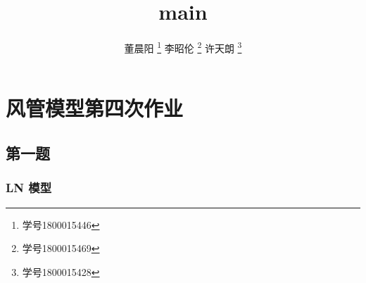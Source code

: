 \documentclass[11pt]{article}
\author{
    董晨阳 \thanks{学号1800015446}
    李昭伦 \thanks{学号1800015469}
    许天朗 \thanks{学号1800015428}
}
\title{main}
\begin{document}
    
    \maketitle
    
    

    
    \hypertarget{ux98ceux7ba1ux6a21ux578bux7b2cux56dbux6b21ux4f5cux4e1a}{%
\section{风管模型第四次作业}\label{ux98ceux7ba1ux6a21ux578bux7b2cux56dbux6b21ux4f5cux4e1a}}

\hypertarget{ux7b2cux4e00ux9898}{%
\subsection{第一题}\label{ux7b2cux4e00ux9898}}

\hypertarget{ln-ux6a21ux578b}{%
\subsubsection{LN 模型}\label{ln-ux6a21ux578b}}
\end{document}
